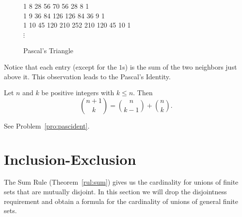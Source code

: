 \begin{figure}[h]
{1 \hspace{3mm} 8 \hspace{3mm} 28 \hspace{3mm} 56 \hspace{3mm} 70 \hspace{3mm} 56 \hspace{3mm} 28 \hspace{3mm} 8 \hspace{3mm} 1\\
1 \hspace{3mm} 9 \hspace{3mm} 36 \hspace{3mm} 84 \hspace{3mm} 126 \hspace{3mm} 126 \hspace{3mm} 84 \hspace{3mm} 36 \hspace{3mm} 9 \hspace{3mm} 1 \\
1 \hspace{3mm} 10 \hspace{3mm} 45 \hspace{3mm} 120 \hspace{3mm} 210 \hspace{3mm} 252 \hspace{3mm} 210 \hspace{3mm} 120 \hspace{3mm} 45 \hspace{3mm} 10 \hspace{3mm} 1 \\
$\vdots$
}\caption{Pascal's Triangle}\label{fig:pascal}
\end{figure}

Notice that each entry (except for the $1$s) is the sum of the two neighbors just above it.
This observation leads to the Pascal's Identity.

\begin{thm}\label{thm:pascalIdent}
Let $n$ and $k$ be positive integers with $k\leq n$.  Then
$$\binom{n+1}{k}=\binom{n}{k-1}+\binom{n}{k}.$$
\begin{pf}
See Problem~\ref{pro:pascident}.
\end{pf}
\end{thm}


\section{Inclusion-Exclusion}\label{sec:inclExcl}
The Sum Rule (Theorem~\ref{rul:sum}) gives us the cardinality for unions of
finite sets that are mutually disjoint. In this section we will drop
the disjointness requirement and obtain a formula for the
cardinality of unions of general finite sets.

